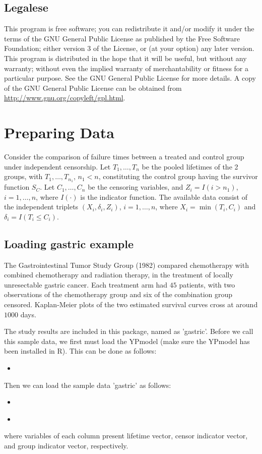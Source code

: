 \documentclass[12pt]{article}
\newcommand{\insertcode}[2]{\begin{itemize}\item[]\end{itemize}} %
\begin{document}
\subsection{Legalese}
This program is free software; you can redistribute it and/or modify it under the terms of the
GNU General Public License as published by the Free Software Foundation; either version 3 of
the License, or (at your option) any later version.
This program is distributed in the hope that it will be useful, but without any warranty;
without even the implied warranty of merchantability or fitness for a particular purpose. See
the GNU General Public License for more details.
A copy of the GNU General Public License can be obtained from \href{http://www.gnu.org/copyleft/gpl.html}{http://www.gnu.org/copyleft/gpl.html}.
%

\section{Preparing Data}\label{Section.Model}
Consider the comparison of failure times between a treated and control group under independent censorship.
Let $T_1, \ldots , T_n$ be the pooled lifetimes of the 2 groups, with $T_1, \ldots , T_{n_1}$, $n_1 < n$, constituting the control group having the survivor function $S_C$.
Let $C_1, \ldots , C_n$ be the censoring variables, and $Z_i = I (i > n_1)$, $i = 1, \ldots, n$, where $I (\cdot)$ is the indicator function.
The available data consist of the independent triplets $(X_i , \delta_i , Z_i )$, $i = 1, \ldots, n$, where $X_i = \min(T_i, C_i)$ and $\delta_i = I (T_i \leq C_i)$.

\subsection{Loading gastric example}\label{gastric.data}
The Gastrointestinal Tumor Study Group (1982) \cite{schein2006comparison} compared chemotherapy with combined chemotherapy and radiation therapy, in the treatment
of locally unresectable gastric cancer. Each treatment arm had $45$ patients, with two observations
of the chemotherapy group and six of the combination group censored. Kaplan-Meier plots of the
two estimated survival curves cross at around $1000$ days.

The study results are included in this package, named as 'gastric'. Before we call this sample data, we first must load the YPmodel (make sure the YPmodel has been installed in R). This can be done as follows:
\insertcode{"Scripts/code3.pl"}{Loading YPmodel package.}
Then we can load the sample data 'gastric' as follows:
\insertcode{"Scripts/code4.pl"}{Loading sample data.}
\insertcode{"Scripts/result4.pl"}{Results of scripts.}
where variables of each column present lifetime vector, censor indicator vector, and group indicator vector, respectively.
\end{document}
